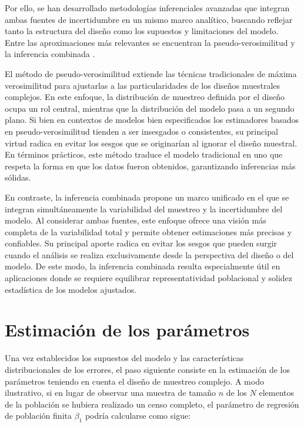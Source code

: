 \documentclass[
  spanish,
  12pt,
]{book}
\begin{document}
Por ello, se han desarrollado metodologías inferenciales avanzadas que integran ambas fuentes de incertidumbre en un mismo marco analítico, buscando reflejar tanto la estructura del diseño como los supuestos y limitaciones del modelo. Entre las aproximaciones más relevantes se encuentran la pseudo-verosimilitud \citep{molina1992pseudo} y la inferencia combinada \citep{binder2011estimating}.

El método de pseudo-verosimilitud extiende las técnicas tradicionales de máxima verosimilitud para ajustarlas a las particularidades de los diseños muestrales complejos. En este enfoque, la distribución de muestreo definida por el diseño ocupa un rol central, mientras que la distribución del modelo pasa a un segundo plano. Si bien en contextos de modelos bien especificados los estimadores basados en pseudo-verosimilitud tienden a ser insesgados o consistentes, su principal virtud radica en evitar los sesgos que se originarían al ignorar el diseño muestral. En términos prácticos, este método traduce el modelo tradicional en uno que respeta la forma en que los datos fueron obtenidos, garantizando inferencias más sólidas.

En contraste, la inferencia combinada propone un marco unificado en el que se integran simultáneamente la variabilidad del muestreo y la incertidumbre del modelo. Al considerar ambas fuentes, este enfoque ofrece una visión más completa de la variabilidad total y permite obtener estimaciones más precisas y confiables. Su principal aporte radica en evitar los sesgos que pueden surgir cuando el análisis se realiza exclusivamente desde la perspectiva del diseño o del modelo. De este modo, la inferencia combinada resulta especialmente útil en aplicaciones donde se requiere equilibrar representatividad poblacional y solidez estadística de los modelos ajustados.

\section{Estimación de los parámetros}\label{estimaciuxf3n-de-los-paruxe1metros}

Una vez establecidos los supuestos del modelo y las características distribucionales de los errores, el paso siguiente consiste en la estimación de los parámetros teniendo en cuenta el diseño de muestreo complejo. A modo ilustrativo, si en lugar de observar una muestra de tamaño \(n\) de los \(N\) elementos de la población se hubiera realizado un censo completo, el parámetro de regresión de población finita \(\beta_{1}\) podría calcularse como sigue:
\end{document}
